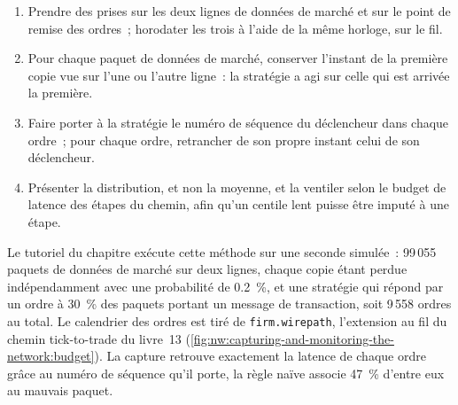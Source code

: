 \begin{method}\label{met:nw:capturing-and-monitoring-the-network:w2w}
\begin{enumerate}
\item Prendre des prises sur les deux lignes de données de marché et sur le point de remise des ordres~; horodater les trois à l'aide de la même horloge, sur le fil.
\item Pour chaque paquet de données de marché, conserver l'instant de la première copie vue sur l'une ou l'autre ligne~: la stratégie a agi sur celle qui est arrivée la première.
\item Faire porter à la stratégie le numéro de séquence du déclencheur dans chaque ordre~; pour chaque ordre, retrancher de son propre instant celui de son déclencheur.
\item Présenter la distribution, et non la moyenne, et la ventiler selon le budget de latence des étapes du chemin, afin qu'un centile lent puisse être
  imputé à une étape.
\end{enumerate}
\end{method}

Le tutoriel du chapitre exécute cette méthode sur une seconde simulée~: 99\,055 paquets de données de marché sur deux lignes, chaque copie étant perdue indépendamment
avec une probabilité de 0.2~\%, et une stratégie qui répond par un ordre à 30~\% des paquets portant un message de transaction, soit 9\,558 ordres au total. Le
calendrier des ordres est tiré de \texttt{firm.wirepath}, l'extension au fil du chemin tick-to-trade du livre~13
(\cref{fig:nw:capturing-and-monitoring-the-network:budget}). La capture retrouve exactement la latence de chaque ordre grâce au numéro de séquence qu'il porte,
la règle naïve associe 47~\% d'entre eux au mauvais paquet.

